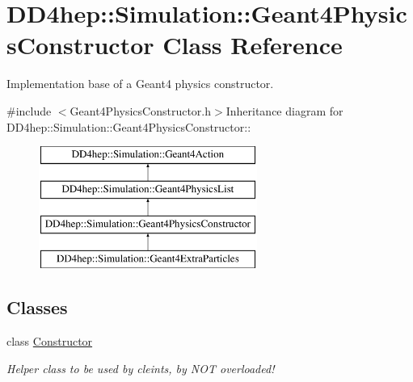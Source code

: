 \hypertarget{class_d_d4hep_1_1_simulation_1_1_geant4_physics_constructor}{
\section{DD4hep::Simulation::Geant4PhysicsConstructor Class Reference}
\label{class_d_d4hep_1_1_simulation_1_1_geant4_physics_constructor}
}


Implementation base of a Geant4 physics constructor.  


{\ttfamily \#include $<$Geant4PhysicsConstructor.h$>$}Inheritance diagram for DD4hep::Simulation::Geant4PhysicsConstructor::\begin{figure}[H]
\begin{center}
\leavevmode
\includegraphics[height=4cm]{class_d_d4hep_1_1_simulation_1_1_geant4_physics_constructor}
\end{center}
\end{figure}
\subsection*{Classes}
\begin{DoxyCompactItemize}
\item 
class \hyperlink{class_d_d4hep_1_1_simulation_1_1_geant4_physics_constructor_1_1_constructor}{Constructor}
\begin{DoxyCompactList}\small\item\em Helper class to be used by cleints, by NOT overloaded! \item\end{DoxyCompactList}\end{DoxyCompactItemize}
